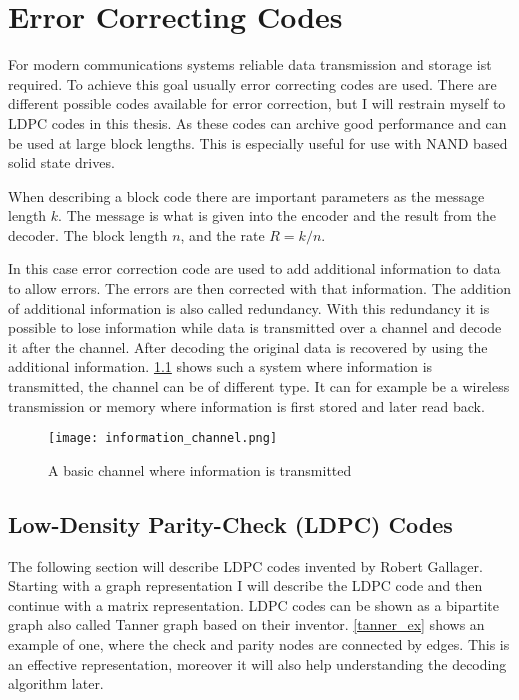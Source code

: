 
\chapter{Error Correcting Codes}

For modern communications systems reliable data transmission and storage ist required. To achieve this goal usually error correcting codes are used. There are different possible codes available for error correction, but I will restrain myself to LDPC\cite{Ga63} codes in this thesis. As these codes can archive good performance and can be used at large block lengths\cite{TaSc2017}. This is especially useful for use with NAND based solid state drives.

When describing a block code there are important parameters as the message length $k$. The message is what is given into the encoder and the result from the decoder. The block length $n$, and the rate $R = k / n$. 

In this case error correction code are used to add additional information to data to allow errors. The errors are then corrected with that information. The addition of additional information is also called redundancy. With this redundancy it is possible to lose information while data is transmitted over a channel and decode it after the channel. After decoding the original data is recovered by using the additional information. \cref{channel_basic} shows such a system where information is transmitted, the channel can be of different type. It can for example be a wireless transmission or memory where information is first stored and later read back. 

\begin{figure}
	\texttt{[image: information\_channel.png]}
	
	\centering
	\caption{A basic channel where information is transmitted}	
	\label{channel_basic}
\end{figure}

\section{Low-Density Parity-Check (LDPC) Codes}

The following section will describe LDPC codes invented by Robert Gallager\cite{Ga63}. Starting with a graph representation I will describe the LDPC code and then continue with a matrix representation. LDPC codes can be shown as a bipartite graph also called Tanner graph\cite{Ta81} based on their inventor. \cref{tanner_ex} shows an example of one, where the check and parity nodes are connected by edges. This is an effective representation, moreover it will also help understanding the decoding algorithm later.

